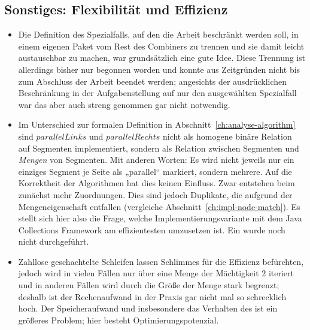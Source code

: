 \documentclass[../main/thesis.tex]{subfiles}
\begin{document}
\subsection{Sonstiges: Flexibilität und Effizienz}

\begin{itemize}

\item
Die Definition des Spezialfalls, auf den die Arbeit beschränkt werden soll, in einem eigenen Paket  vom Rest des Combiners zu trennen und sie damit leicht austauschbar zu machen, war grundsätzlich eine gute Idee.
Diese Trennung ist allerdings bisher nur begonnen worden und konnte aus Zeitgründen nicht bis zum Abschluss der Arbeit beendet werden; angesichts der ausdrücklichen Beschränkung in der Aufgabenstellung auf nur den ausgewählten Spezialfall war das aber auch streng genommen gar nicht notwendig.

\item
Im Unterschied zur formalen Definition in Abschnitt~\ref{ch:analyse-algorithm} sind $parallelLinks$ und $parallelRechts$ nicht als homogene binäre Relation auf Segmenten implementiert, sondern als Relation zwischen Segmenten und \emph{Mengen} von Segmenten.
Mit anderen Worten: Es wird nicht jeweils nur ein einziges Segment je Seite als „parallel“ markiert, sondern mehrere.
Auf die Korrektheit der Algorithmen hat dies keinen Einfluss.
Zwar entstehen beim  zunächst mehr Zuordnungen.
Dies sind jedoch Duplikate, die aufgrund der Mengeneigenschaft entfallen (vergleiche Abschnitt~\ref{ch:impl-node-match}).
Es stellt sich hier also die Frage, welche Implementierungsvariante mit dem Java Collections Framework am effizientesten umzusetzen ist.
Ein  wurde noch nicht durchgeführt.

\item
Zahllose geschachtelte Schleifen lassen Schlimmes für die Effizienz befürchten, jedoch wird in vielen Fällen nur über eine Menge der Mächtigkeit $2$ iteriert
und in anderen Fällen wird durch  die Größe der Menge stark begrenzt; deshalb ist der Rechenaufwand in der Praxis gar nicht mal so schrecklich hoch.
Der Speicheraufwand und insbesondere das Verhalten des  ist ein größeres Problem; hier besteht Optimierungspotenzial.


\end{itemize}
\end{document}
